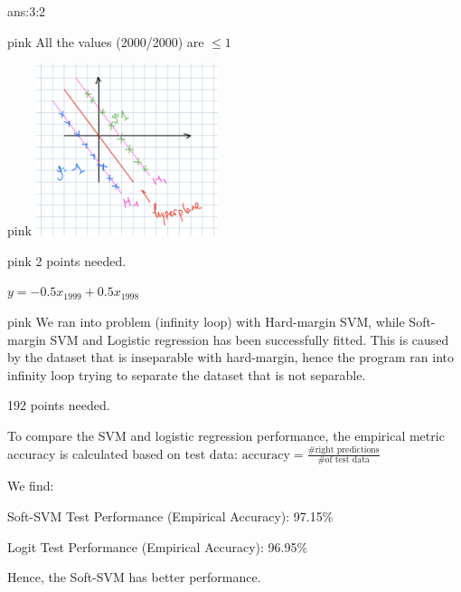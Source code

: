 \documentclass{tron}
\begin{document}
\newpage
\begin{answer}[Conclustion]{ans:3:2}
	\begin{note}{pink}{}
		All the values (2000/2000) are $\leq 1$
	\end{note}
	
	\begin{note}{pink}{}
		\includegraphics[height=190px]{Fig/q3-2}
	\end{note}
	
	\begin{note}{pink}{}
		2 points needed.
		
		$y = -0.5 x_{1999} + 0.5 x_{1998}$
	\end{note}
	
	\begin{note}{pink}{}
		We ran into problem (infinity loop) with Hard-margin SVM, while Soft-margin SVM and Logistic regression has been successfully fitted. This is caused by the dataset that is inseparable with hard-margin, hence the program ran into infinity loop trying to separate the dataset that is not separable.

		192 points needed.
		
		
		To compare the SVM and logistic regression performance, the empirical metric accuracy is calculated based on test data: $\text{accuracy} = \frac{\text{\# right predictions}}{\text{\# of test data}}$
		
		We find:
		
		Soft-SVM Test Performance (Empirical Accuracy): 97.15\%
		
		Logit Test Performance (Empirical Accuracy): 96.95\%
		
		Hence, the Soft-SVM has better performance.
				

\end{note}
\end{answer}
\end{document}
